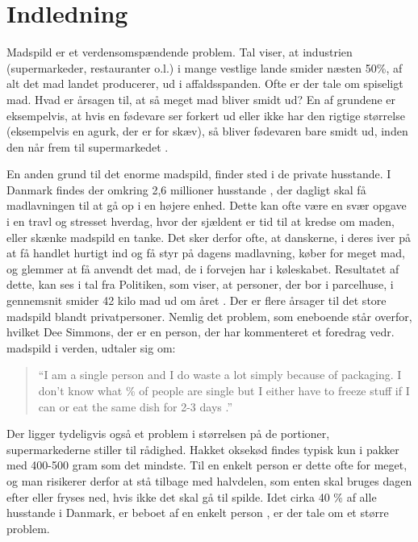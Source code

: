 \chapter{Indledning}
\label{sec:indledning}

Madspild er et verdensomspændende problem. Tal viser, at industrien (supermarkeder, restauranter o.l.) i mange vestlige lande smider næsten 50\%, af alt det mad landet producerer, ud i affaldsspanden. Ofte er der tale om spiseligt mad. Hvad er årsagen til, at så meget mad bliver smidt ud? En af grundene er eksempelvis, at hvis en fødevare ser forkert ud eller ikke har den rigtige størrelse (eksempelvis en agurk, der er for skæv), så bliver fødevaren bare smidt ud, inden den når frem til \fx supermarkedet \cite{tedmadspild}. 

En anden grund til det enorme madspild, finder sted i de private husstande. I Danmark findes der omkring 2,6 millioner husstande \cite{husstande}, der dagligt skal få madlavningen til at gå op i en højere enhed. Dette kan ofte være en svær opgave i en travl og stresset hverdag, hvor der sjældent er tid til at kredse om maden, eller skænke madspild en tanke. Det sker derfor ofte, at danskerne, i deres iver på at få handlet hurtigt ind og få styr på dagens madlavning, køber for meget mad, og glemmer at få anvendt det mad, de i forvejen har i køleskabet. Resultatet af dette, kan ses i tal fra Politiken, som viser, at personer, der bor i parcelhuse, i gennemsnit smider 42 kilo mad ud om året \cite{madspildpol}. Der er flere årsager til det store madspild blandt privatpersoner. Nemlig det problem, som eneboende står overfor, hvilket Dee Simmons, der er en person, der har kommenteret et foredrag vedr. madspild i verden, udtaler sig om: 

\begin{quote}
``I am a single person and I do waste a lot simply because of packaging. I don't know what \% of people are single but I either have to freeze stuff if I can or eat the same dish for 2-3 days \cite{tedcomment}.''
\end{quote}
 
Der ligger tydeligvis også et problem i størrelsen på de portioner, supermarkederne stiller til rådighed. Hakket oksekød findes typisk kun i pakker med 400-500 gram som det mindste. Til en enkelt person er dette ofte for meget, og man risikerer derfor at stå tilbage med halvdelen, som enten skal bruges dagen efter eller fryses ned, hvis ikke det skal gå til spilde. Idet cirka 40 \% af alle husstande i Danmark, er beboet af en enkelt person \cite{madspild16}, er der tale om et større problem.

